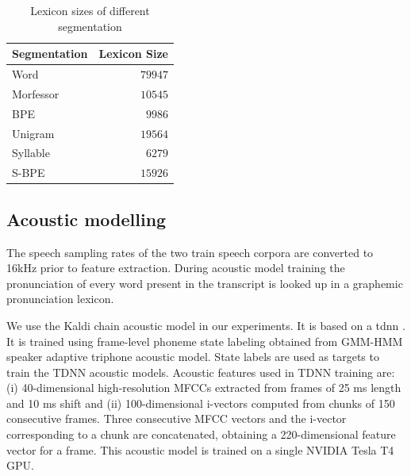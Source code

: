 \begin{table}[ht]
    \centering
    \caption{Lexicon sizes of different segmentation}
    \label{tab:lexiconsize}
    \begin{tabular}{lr}
        \hline \hline
        \textbf{Segmentation} & \textbf{Lexicon Size} \\
        \hline
        Word                  & $79947$               \\
        Morfessor             & $10545$               \\
        BPE                   & $9986$                \\
        Unigram               & $19564$               \\
        Syllable              & $6279$                \\
        S-BPE                 & $15926$               \\ \hline
    \end{tabular}

\end{table}

\subsection{Acoustic modelling}

The speech sampling rates of the two train speech corpora are converted to
16kHz prior to feature extraction. During acoustic model training the
pronunciation of every word present in the transcript is looked up in a
graphemic pronunciation lexicon.

We use the Kaldi chain acoustic model in our experiments. It is based on a \gls{tdnn} \cite{peddinti2015time}. It is trained using
frame-level phoneme state labeling obtained from GMM-HMM speaker adaptive
triphone acoustic model. State labels are used as targets to train the TDNN
acoustic models. Acoustic features used in TDNN training are: (i)
40-dimensional high-resolution MFCCs extracted from frames of 25 ms length and
10 ms shift and (ii) 100-dimensional i-vectors \cite{saon2013speaker} computed
from chunks of 150 consecutive frames. Three consecutive MFCC vectors and the
i-vector corresponding to a chunk are concatenated, obtaining a 220-dimensional
feature vector for a frame. This acoustic model is trained on a single NVIDIA
Tesla T4 GPU.

